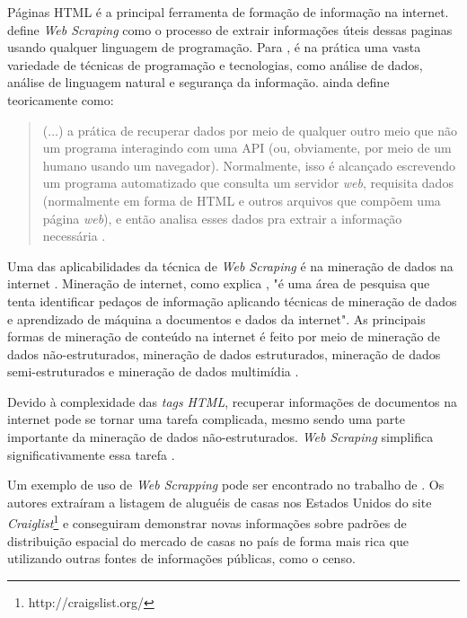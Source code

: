 Páginas HTML é a principal ferramenta de formação de informação na internet.  define \textit{Web Scraping} como o processo de extrair informações úteis dessas paginas usando qualquer linguagem de programação. Para , é na prática uma vasta variedade de técnicas de programação e tecnologias, como análise de dados, análise de linguagem natural e segurança da informação.  ainda define teoricamente como:

\begin{quote}
    (...) a prática de recuperar dados por meio de qualquer outro meio que não um programa interagindo com uma API (ou, obviamente, por meio de um humano usando um navegador). Normalmente, isso é alcançado escrevendo um programa automatizado que consulta um servidor \textit{web}, requisita dados (normalmente em forma de HTML e outros arquivos que compõem uma página \textit{web}), e então analisa esses dados pra extrair a informação necessária
    \cite[p.~ix, tradução nossa]{mitchell2018web}.
\end{quote}

Uma das aplicabilidades da técnica de \textit{Web Scraping} é na mineração de dados na internet \cite{dastidar2016intelligent}. Mineração de internet, como explica , "é uma área de pesquisa que tenta identificar pedaços de informação aplicando técnicas de mineração de dados e aprendizado de máquina a documentos e dados da internet". As principais formas de mineração de conteúdo na internet é feito por meio de mineração de dados não-estruturados, mineração de dados estruturados, mineração de dados semi-estruturados e mineração de dados multimídia \cite{dastidar2016intelligent}.

Devido à complexidade das \textit{tags} \textit{HTML}, recuperar informações de documentos na internet pode se tornar uma tarefa complicada, mesmo sendo uma parte importante da mineração de dados não-estruturados. \textit{Web Scraping} simplifica significativamente essa tarefa \cite{dastidar2016intelligent}.

Um exemplo de uso de \textit{Web Scrapping} pode ser encontrado no trabalho de . Os autores extraíram a listagem de aluguéis de casas nos Estados Unidos do site \textit{Craiglist}\footnote{http://craigslist.org/} e conseguiram demonstrar novas informações sobre padrões de distribuição espacial do mercado de casas no país de forma mais rica que utilizando outras fontes de informações públicas, como o censo.